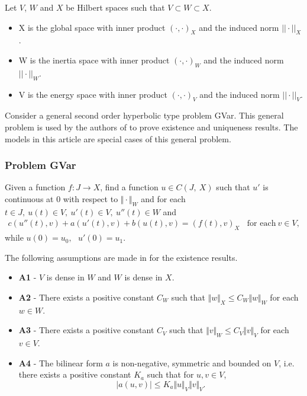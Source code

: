 Let $V$, $W$ and $X$ be Hilbert spaces such that $V \subset W \subset X$.
\begin{itemize}
	\item[] X is the global space with inner product $(\cdot,\cdot)_X$ and the induced norm $||\cdot||_X$.
	\item[] W is the inertia space with inner product $(\cdot,\cdot)_W$ and the induced norm $||\cdot||_W$.
	\item[] V is the energy space with inner product $(\cdot,\cdot)_V$ and the induced norm $||\cdot||_V$.
\end{itemize}

Consider a general second order hyperbolic type problem GVar. This general problem is used by the 
authors of \cite{VV02} to prove existence and uniqueness results. The models in this article are 
special cases of this general problem.

\subsubsection*{Problem GVar}\label{sssec:existence:ProblemGVar}
Given a function $f:J\rightarrow X$, find a function $u\in C(J,\ X)$ such that $u'$ is continuous at $0$ with respect to $\Vert \cdot \Vert_{W}$ and for each $t\in J,\ u(t)\in V,\ u'(t) \in V,\ u''(t)\in W$ and
\begin{eqnarray}
	c(u''(t),v)+a(u'(t),v)+b(u(t),v)= (f(t),v)_{X} \ \ \ \ \textrm{for each} \ v \in V, \label{eq:existence:ProblemGVar}
\end{eqnarray}
while $u(0)=u_{0},\ \ \ u'(0)=u_{1}$.


The following assumptions are made in \cite{VV02} for the existence results.
\begin{itemize}
	\item[] \textbf{A1} - $V$ is dense in $W$ and $W$ is dense in $X$.

	\item[] \textbf{A2} - There exists a positive constant $C_{W}$ such that $\Vert w\Vert_{X} \leq C_{W}\Vert w\Vert_{W}$ for each $ w\in W$.

	\item[] \textbf{A3} - There exists a positive constant $C_{V}$ such that $\Vert v\Vert_{W} \leq C_{V}\Vert v\Vert_{V}$ for each $v \in V$.

	\item[] \textbf{A4} - The bilinear form $a$ is non-negative, symmetric and bounded on $V$, i.e. there exists a positive constant $K_a$ such that for $\displaystyle u,v \in V$, \[|a(u,v)| \leq K_a\Vert u \Vert_V \Vert v \Vert_V.\]
\end{itemize}

